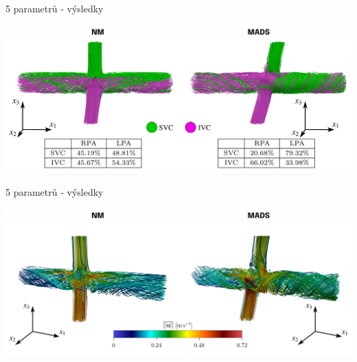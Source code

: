 \documentclass[aspectratio=169,xcolor=dvipsnames]{beamer}
\begin{document}
\begin{frame}{5 parametrů - výsledky}
	
	\addtocounter{framenumber}{-1}
	\begin{center}
		\includegraphics[width=0.95\linewidth, trim={0 0 0 0}, clip]{Images/popisky.png}
		\includegraphics[width=0.99\linewidth, trim={0 0 0 0}, clip]{Images/split.png}
	\end{center}	
\end{frame}
\begin{frame}{5 parametrů - výsledky}
	
	\addtocounter{framenumber}{-1}
	\begin{center}
		\includegraphics[width=0.95\linewidth, trim={0 0 0 0}, clip]{Images/popisky.png}
		\includegraphics[width=0.99\linewidth, trim={0 0 0 0}, clip]{Images/streamlines.png}
	\end{center}	
\end{frame}

\end{document}
